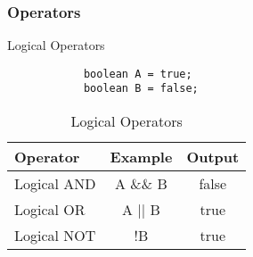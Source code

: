 \documentclass[10pt, compress]{beamer}
\begin{document}
\begin{frame}[fragile]
	\frametitle{Operators}
	\begin{block}{Logical Operators}
		\begin{verbatim}
			boolean A = true;
			boolean B = false;
		\end{verbatim}
		\begin{table}
			\begin{tabular}{lcc}
				\toprule
				Operator & Example & Output\\
				\midrule
				Logical AND & A \&\& B & false\\
				Logical OR & A || B & true\\
				Logical NOT & !B & true\\
				\bottomrule
			\end{tabular}
			\caption{Logical Operators}
		\end{table}
	\end{block}
\end{frame}

\end{document}
